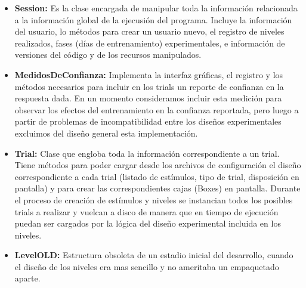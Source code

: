 \documentclass{article}
\begin{document}
\begin{itemize}
\begin{itemize}
            \item \textbf{Session:} Es la clase encargada de manipular toda la información relacionada a la información global de la ejecusión del programa. Incluye la información del usuario, lo métodos para crear un usuario nuevo, el registro de niveles realizados, fases (días de entrenamiento) experimentales, e información de versiones del código y de los recursos manipulados. 
            \item \textbf{MedidosDeConfianza:} Implementa la interfaz gráficas, el registro y los métodos necesarios para incluir en los trials un reporte de confianza en la respuesta dada. En un momento consideramos incluir esta medición para observar los efectos del entrenamiento en la confianza reportada, pero luego a partir de problemas de incompatibilidad entre los diseños experimentales excluimos del diseño general esta implementación. 
            \item \textbf{Trial:} Clase que engloba toda la información correspondiente a un trial. Tiene métodos para poder cargar desde los archivos de configuración el diseño correspondiente a cada trial (listado de estímulos, tipo de trial, disposición en pantalla) y para crear las correspondientes cajas (Boxes) en pantalla. Durante el proceso de creación de estímulos y niveles se instancian todos los posibles trials a realizar y vuelcan a disco de manera que en tiempo de ejecución puedan ser cargados por la lógica del diseño experimental incluida en los niveles.
            \item \textbf{LevelOLD:} Estructura obsoleta de un estadio inicial del desarrollo, cuando el diseño de los niveles era mas sencillo y no ameritaba un empaquetado aparte. 
            
        \end{itemize}
        

\end{itemize}
\end{document}
